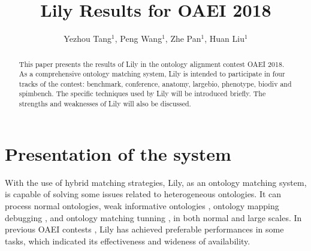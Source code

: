 \documentclass{llncs}
\begin{document}
\mainmatter              %
\title{Lily Results for OAEI 2018}
\author{Yezhou Tang$^{1}$, Peng Wang$^{1}$, Zhe Pan$^{1}$, Huan Liu$^{1}$}


\maketitle

\begin{abstract}
This paper presents the results of Lily in the ontology alignment contest OAEI 2018. As a comprehensive ontology matching system, Lily is intended to participate in four tracks of the contest: benchmark, conference, anatomy, largebio, phenotype, biodiv and spimbench. The specific techniques used by Lily will be introduced briefly. The strengths and weaknesses of Lily will also be discussed.
\end{abstract}

\section{Presentation of the system}
With the use of hybrid matching strategies, Lily, as an ontology matching system, is capable of solving some issues related to heterogeneous ontologies. It can process normal ontologies, weak informative ontologies \cite{simprop}, ontology mapping debugging \cite{om_dbg}, and ontology matching tunning \cite{param_tuning}, in both normal and large scales. In previous OAEI contests \cite{lily_oaei2009,lily_oaei2008,lily_oaei2007}, Lily has achieved preferable performances in some tasks, which indicated its effectiveness and wideness of availability. \par
\end{document}
